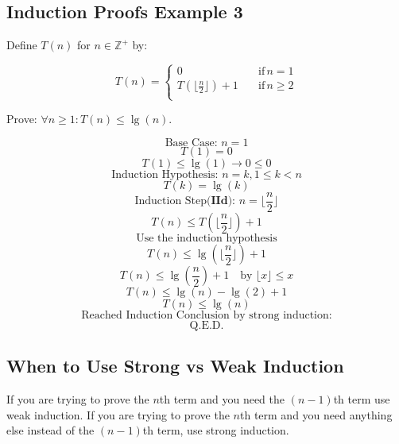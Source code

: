 \documentclass{article}
\begin{document}
\subsection{Induction Proofs Example 3}
Define $T(n)$ for $n \in \mathbb{Z}^+$ by:


\begin{equation*}
T(n)=\begin{cases}
          0 \quad &\text{if} \, n = 1 \\
          T(\lfloor \frac{n}{2} \rfloor) + 1\quad &\text{if} \, n \ge 2\\
     \end{cases}
\end{equation*}

Prove: $\forall n \ge 1: T(n) \le \lg(n)$.

$$\text{Base Case: } n = 1$$
$$T(1) = 0$$
$$T(1) \le \lg(1) \rightarrow 0 \le 0$$
$$\text{Induction Hypothesis: } n = k, 1 \le k < n $$
$$T(k) = \lg(k)$$
$$\text{Induction Step(} \textbf{IId} \text{): } n = \lfloor \frac{n}{2} \rfloor$$
$$T(n) \le T(\lfloor \frac{n}{2} \rfloor) + 1$$
$$\text{Use the induction hypothesis}$$
$$T(n) \le \lg(\lfloor \frac{n}{2} \rfloor) + 1$$
$$T(n) \le \lg(\frac{n}{2}) + 1 \quad \text{by } \lfloor x \rfloor \le x$$
$$T(n) \le \lg(n) - \lg(2) + 1 $$
$$T(n) \le \lg(n) $$
$$\text{Reached Induction Conclusion by strong induction:}$$
$$\text{Q.E.D.}$$

\subsection{When to Use Strong vs Weak Induction}

If you are trying to prove the $n$th term and you need the $(n-1)$th term use weak induction. If you are trying to prove the $n$th term and you need anything else instead of the $(n-1)$th term, use strong induction.

\iftrue
    

















\fi
\end{document}
